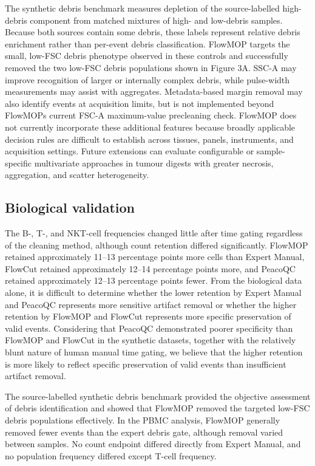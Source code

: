 \documentclass[ASNA]{latex/wiley/USG}
\begin{document}
The synthetic debris benchmark measures depletion of the source-labelled
high-debris component from matched mixtures of high- and low-debris
samples. Because both sources contain some debris, these labels
represent relative debris enrichment rather than per-event debris
classification. FlowMOP targets the small, low-FSC debris phenotype
observed in these controls and successfully removed the two low-FSC
debris populations shown in Figure 3A. SSC-A may improve recognition of
larger or internally complex debris, while pulse-width measurements may
assist with aggregates. Metadata-based margin removal may also identify
events at acquisition limits, but is not implemented beyond
FlowMOP\textquotesingle s current FSC-A maximum-value precleaning check.
FlowMOP does not currently incorporate these additional features because
broadly applicable decision rules are difficult to establish across
tissues, panels, instruments, and acquisition settings. Future
extensions can evaluate configurable or sample-specific multivariate
approaches in tumour digests with greater necrosis, aggregation, and
scatter heterogeneity.

\subsection{Biological validation}\label{biological-validation-1}

The B-, T-, and NKT-cell frequencies changed little after time gating
regardless of the cleaning method, although count retention differed
significantly. FlowMOP retained approximately 11--13 percentage points
more cells than Expert Manual, FlowCut retained approximately 12--14
percentage points more, and PeacoQC retained approximately 12--13
percentage points fewer. From the biological data alone, it is difficult
to determine whether the lower retention by Expert Manual and PeacoQC
represents more sensitive artifact removal or whether the higher
retention by FlowMOP and FlowCut represents more specific preservation
of valid events. Considering that PeacoQC demonstrated poorer
specificity than FlowMOP and FlowCut in the synthetic datasets, together
with the relatively blunt nature of human manual time gating, we believe
that the higher retention is more likely to reflect specific
preservation of valid events than insufficient artifact removal.

The source-labelled synthetic debris benchmark provided the objective
assessment of debris identification and showed that FlowMOP removed the
targeted low-FSC debris populations effectively. In the PBMC analysis,
FlowMOP generally removed fewer events than the expert debris gate,
although removal varied between samples. No count endpoint differed
directly from Expert Manual, and no population frequency differed except
T-cell frequency.
\end{document}
